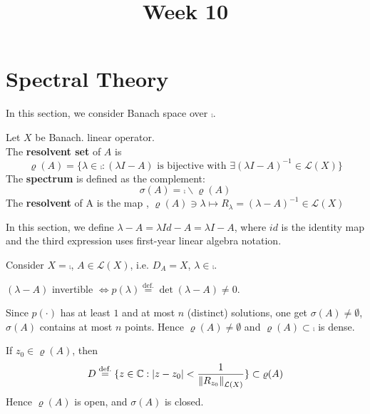 \documentclass{article}
\title{Week 10}
\begin{document}
\maketitle


\section{Spectral Theory}\label{Spectral theory chapter}
In this section, we consider Banach space over $\comp$. 

\begin{definition}\nl
Let $X$ be Banach.   linear operator.\\
The {\textbf{resolvent set}} of $A$ is
$$
\varrho({A})=
\{
\lambda\in\comp:(\lambda I-A) \text{ is bijective with } \exists (\lambda I-A)^{-1}\in \mathcal{L}(X)
\}
$$
The {\textbf{spectrum}} is defined as the complement:
$$
\sigma(A)=\comp\backslash\varrho(A)
$$
The {\textbf{resolvent}} of A is the map , $\varrho(A)\ni\lambda\mapsto R_\lambda= (\lambda-A)^{-1}\in\mathcal{L}(X)$
\end{definition}

\begin{remark}\nl
    In this section, we define $\lambda-A=\lambda Id -A=\lambda I-A$, where $id$ is the identity map and the third expression uses first-year linear algebra notation.
\end{remark}

\begin{example}\nl
    Consider $X=\comp$, $A\in \mathcal{L}(X)$, i.e. $D_A=X$, $\lambda\in\comp$.\\
    \begin{center}
        $(\lambda-A)$ invertible $\iff p(\lambda)\stackrel{\text{def.}}{=}\det(\lambda-A)\neq0$.  
    \end{center}  
    
    Since  $p(\cdot)$ has at least $1$ and at most $n$ (distinct) solutions, one get $\sigma(A)\neq \emptyset$, $\sigma(A)$ contains at most $n$ points. Hence $\varrho(A)\neq\emptyset$ and $\varrho(A)\subset\comp$ is dense.
\end{example}

\begin{lemma}\nl
\label{spectrum is closed}
If $z_0\in\varrho(A)$, then 
$$D\stackrel{\text{def.}}{=}
\{
z\in\mathbb{C}:|z-z_0|<\frac{1}{\left\|{R_{z_0}}\right\|_{\mathcal{L}(X)}}
\}
\subset\varrho(A)$$
Hence $\varrho(A)$ is open, and $\sigma(A)$ is closed.
\end{lemma}
\end{document}
